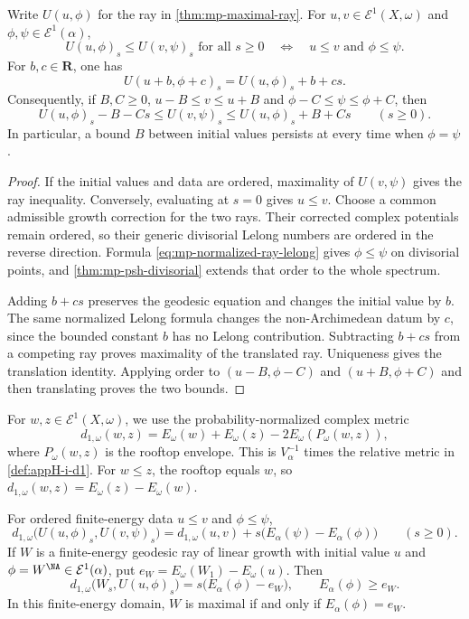 \begin{proposition}\label{prop:mp-maximal-order}
Write $U(u,\phi)$ for the ray in \cref{thm:mp-maximal-ray}. For $u,v\in\mathcal E^1(X,\omega)$ and $\phi,\psi\in\mathcal E^1(\alpha)$,
\[
 U(u,\phi)_s\leq U(v,\psi)_s\text{ for all }s\geq0
 \quad\Longleftrightarrow\quad u\leq v\text{ and }\phi\leq\psi.
\]
For $b,c\in\mathbf R$, one has
\[
                  U(u+b,\phi+c)_s=U(u,\phi)_s+b+cs.
\]
Consequently, if $B,C\geq0$, $u-B\leq v\leq u+B$ and $\phi-C\leq\psi\leq\phi+C$, then
\[
 U(u,\phi)_s-B-Cs\leq U(v,\psi)_s
                         \leq U(u,\phi)_s+B+Cs\qquad(s\geq0).
\]
In particular, a bound $B$ between initial values persists at every time when $\phi=\psi$.
\end{proposition}

\begin{proof}
If the initial values and data are ordered, maximality of $U(v,\psi)$ gives the ray inequality. Conversely, evaluating at $s=0$ gives $u\leq v$. Choose a common admissible growth correction for the two rays. Their corrected complex potentials remain ordered, so their generic divisorial Lelong numbers are ordered in the reverse direction. Formula \eqref{eq:mp-normalized-ray-lelong} gives $\phi\leq\psi$ on divisorial points, and \cref{thm:mp-psh-divisorial} extends that order to the whole spectrum.

Adding $b+cs$ preserves the geodesic equation and changes the initial value by $b$. The same normalized Lelong formula changes the non-Archimedean datum by $c$, since the bounded constant $b$ has no Lelong contribution. Subtracting $b+cs$ from a competing ray proves maximality of the translated ray. Uniqueness gives the translation identity. Applying order to $(u-B,\phi-C)$ and $(u+B,\phi+C)$ and then translating proves the two bounds.
\end{proof}

For $w,z\in\mathcal E^1(X,\omega)$, we use the probability-normalized complex metric
\[
 d_{1,\omega}(w,z)
   =E_\omega(w)+E_\omega(z)-2E_\omega(P_\omega(w,z)),
\]
where $P_\omega(w,z)$ is the rooftop envelope. This is $V_\alpha^{-1}$ times the relative metric in \cref{def:appH-i-d1}. For $w\leq z$, the rooftop equals $w$, so $d_{1,\omega}(w,z)=E_\omega(z)-E_\omega(w)$.

\begin{samepage}
\begin{proposition}\label{prop:mp-maximal-ordered-distance}
For ordered finite-energy data $u\leq v$ and $\phi\leq\psi$,
\[
 d_{1,\omega}\bigl(U(u,\phi)_s,U(v,\psi)_s\bigr)
 =d_{1,\omega}(u,v)+s\bigl(E_\alpha(\psi)-E_\alpha(\phi)\bigr)
 \qquad(s\geq0).
\tag{60.23g}\label{eq:mp-maximal-ordered-distance}
\]
If $W$ is a finite-energy geodesic ray of linear growth with initial value $u$ and $\phi=W^{\NA}\in\mathcal E^1(\alpha)$, put $e_W=E_\omega(W_1)-E_\omega(u)$. Then
\[
 d_{1,\omega}\bigl(W_s,U(u,\phi)_s\bigr)
       =s\bigl(E_\alpha(\phi)-e_W\bigr),\qquad E_\alpha(\phi)\geq e_W.
\]
In this finite-energy domain, $W$ is maximal if and only if $E_\alpha(\phi)=e_W$.
\end{proposition}
\end{samepage}

